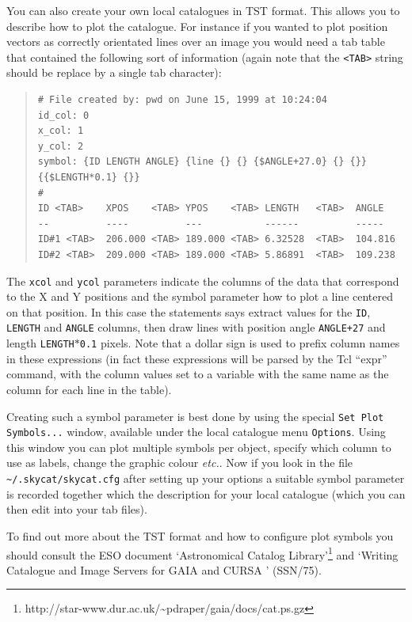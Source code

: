 \documentclass[twoside,11pt]{article}
\newcommand{\htmladdnormallinkfoot}[2]{#1\footnote{#2}}
\newcommand{\xref}[3]{#1}
\renewcommand{\_}{\texttt{\symbol{95}}}
\newcommand{\mytt}[1]{{\texttt{#1}}}
\begin{document}
You can also create your own local catalogues in TST format. This
allows you to describe how to plot the catalogue. For instance if you
wanted to plot position vectors as correctly orientated lines over an
image you would need a tab table that contained the following sort of
information (again note that the \mytt{<TAB>} string should be replace
by a single tab character):
\begin{quote}
\begin{verbatim}
# File created by: pwd on June 15, 1999 at 10:24:04
id_col: 0
x_col: 1
y_col: 2
symbol: {ID LENGTH ANGLE} {line {} {} {$ANGLE+27.0} {} {}} {{$LENGTH*0.1} {}}
#
ID <TAB>    XPOS    <TAB> YPOS    <TAB> LENGTH   <TAB>  ANGLE
--          ----          ---           ------          -----
ID#1 <TAB>  206.000 <TAB> 189.000 <TAB> 6.32528  <TAB>  104.816
ID#2 <TAB>  209.000 <TAB> 189.000 <TAB> 5.86891  <TAB>  109.238
\end{verbatim}
\end{quote}
The \mytt{x\_col} and \mytt{y\_col} parameters indicate the columns of
the data that correspond to the X and Y positions and the symbol
parameter how to plot a line centered on that position. In this case
the statements says extract values for the \mytt{ID}, \mytt{LENGTH}
and \mytt{ANGLE} columns, then draw lines with position angle
\mytt{ANGLE+27} and length \mytt{LENGTH$*$0.1} pixels. Note that a
dollar sign is used to prefix column names in these expressions (in
fact these expressions will be parsed by the Tcl ``expr'' command,
with the column values set to a variable with the same name as the
column for each line in the table).

Creating such a symbol parameter is best done by using the special
\mytt{Set Plot Symbols...} window, available under the local catalogue
menu \mytt{Options}. Using this window you can plot multiple symbols per
object, specify which column to use as labels, change the graphic
colour {\em etc.}. Now if you look in the file
\mytt{\~{}/.skycat/skycat.cfg} after setting up your options a suitable
symbol parameter is recorded together which the description for your
local catalogue (which you can then edit into your tab files).

To find out more about the TST format and how to configure plot
symbols you should consult the ESO document
\htmladdnormallinkfoot{`Astronomical Catalog Library'}
{http://star-www.dur.ac.uk/\~{}pdraper/gaia/docs/cat.ps.gz} and 
`Writing Catalogue and Image Servers for GAIA and CURSA '
(\xref{SSN/75}{ssn75}{}).
\end{document}
